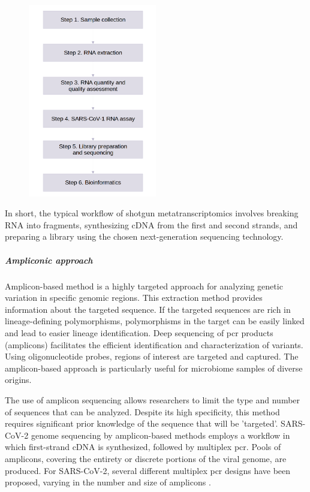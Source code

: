         \begin{figure}[ht!]
        	\centering
            \includegraphics[width=0.5\textwidth]{figures/intro/metatranscriptomics-process.png}
            \label{fig:intro:metatr-process}
        \end{figure}
        
        In short, the typical workflow of shotgun metatranscriptomics involves breaking RNA into fragments, synthesizing cDNA from the first and second strands, and preparing a library using the chosen next-generation sequencing technology.

        \subparagraph{Ampliconic approach} 
        
        Amplicon-based method is a highly targeted approach for analyzing genetic variation in specific genomic regions. This extraction method provides information about the targeted sequence. If the targeted sequences are rich in lineage-defining polymorphisms, polymorphisms in the target can be easily linked and lead to easier lineage identification. Deep sequencing of \acrshort{pcr} products (amplicons) facilitates the efficient identification and characterization of variants. Using oligonucleotide probes, regions of interest are targeted and captured. The amplicon-based approach is particularly useful for microbiome samples of diverse origins.

        The use of amplicon sequencing allows researchers to limit the type and number of sequences that can be analyzed. Despite its high specificity, this method requires significant prior knowledge of the sequence that will be 'targeted’. SARS-CoV-2 genome sequencing by amplicon-based methods employs a workflow in which first-strand cDNA is synthesized, followed by multiplex \acrshort{pcr}. Pools of amplicons, covering the entirety or discrete portions of the viral genome, are produced. For SARS-CoV-2, several different multiplex \acrshort{pcr} designs have been proposed, varying in the number and size of amplicons \cite{chiara2020}.
        
